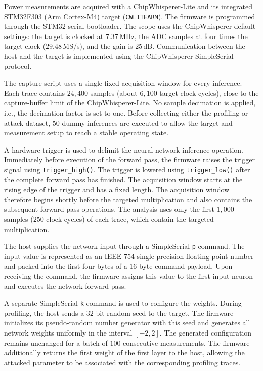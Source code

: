 \documentclass[conference]{IEEEtran}
\begin{document}
Power measurements are acquired with a ChipWhisperer-Lite and its integrated STM32F303 (Arm Cortex-M4) target (\texttt{CWLITEARM}).
The firmware is programmed through the STM32 serial bootloader.
The scope uses the ChipWhisperer default settings: the target is clocked at $7.37$\,MHz, the ADC samples at four times the target clock ($29.48$\,MS/s), and the gain is $25$\,dB.
Communication between the host and the target is implemented using the ChipWhisperer SimpleSerial protocol.

The capture script uses a single fixed acquisition window for every inference.
Each trace contains $24{,}400$ samples (about $6{,}100$ target clock cycles), close to the capture-buffer limit of the ChipWhisperer-Lite.
No sample decimation is applied, i.e., the decimation factor is set to one.
Before collecting either the profiling or attack dataset, $50$ dummy inferences are executed to allow the target and measurement setup to reach a stable operating state.

A hardware trigger is used to delimit the neural-network inference operation.
Immediately before execution of the forward pass, the firmware raises the trigger signal using \texttt{trigger\_high()}.
The trigger is lowered using \texttt{trigger\_low()} after the complete forward pass has finished.
The acquisition window starts at the rising edge of the trigger and has a fixed length.
The acquisition window therefore begins shortly before the targeted multiplication and also contains the subsequent forward-pass operations.
The analysis uses only the first $1{,}000$ samples ($250$ clock cycles) of each trace, which contain the targeted multiplication.

The host supplies the network input through a SimpleSerial \texttt{p} command.
The input value is represented as an IEEE-754 single-precision floating-point number and packed into the first four bytes of a $16$-byte command payload.
Upon receiving the command, the firmware assigns this value to the first input neuron and executes the network forward pass.

A separate SimpleSerial \texttt{k} command is used to configure the weights.
During profiling, the host sends a $32$-bit random seed to the target.
The firmware initializes its pseudo-random number generator with this seed and generates all network weights uniformly in the interval $[-2,2]$.
The generated configuration remains unchanged for a batch of $100$ consecutive measurements.
The firmware additionally returns the first weight of the first layer to the host, allowing the attacked parameter to be associated with the corresponding profiling traces.
\end{document}
